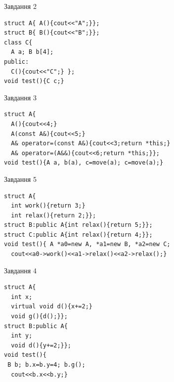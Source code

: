 \documentclass[12pt, ukrainian]{article}
\begin{document}
{{{{{{{{{{{{{\begin{minipage}[t]{11cm}
               
{\begin{center}Завдання {2}\end{center}}
\vspace{-6mm}

\begin{verbatim}
struct A{ A(){cout<<"A";}};
struct B{ B(){cout<<"B";}};
class C{
  A a; B b[4];
public:
  C(){cout<<"C";} };
void test(){C c;}
\end{verbatim}            


               
{\begin{center}Завдання {3}\end{center}}
\vspace{-6mm}

\begin{verbatim}
struct A{
  A(){cout<<4;}
  A(const A&){cout<<5;}
  A& operator=(const A&){cout<<3;return *this;}
  A& operator=(A&&){cout<<6;return *this;}};
void test(){A a, b(a), c=move(a); c=move(a);}
\end{verbatim}            


               
{\begin{center}Завдання {5}\end{center}}
\vspace{-6mm}

\begin{verbatim}
struct A{
  int work(){return 3;}
  int relax(){return 2;}};
struct B:public A{int relax(){return 5;}};
struct C:public A{int relax(){return 4;}};
void test(){ A *a0=new A, *a1=new B, *a2=new C;
  cout<<a0->work()<<a1->relax()<<a2->relax();}
\end{verbatim}            


\end{minipage}
\vline \hspace{8mm}
\begin{minipage}[t]{7cm}
               
{\begin{center}Завдання {4}\end{center}}
\vspace{-6mm}

\begin{verbatim}
struct A{
  int x;
  virtual void d(){x+=2;}
  void g(){d();}};
struct B:public A{
  int y;
  void d(){y+=2;}};
void test(){
 B b; b.x=b.y=4; b.g();
  cout<<b.x<<b.y;}
\end{verbatim}            



\end{minipage}}}}}}}}}}}}}}
\end{document}
